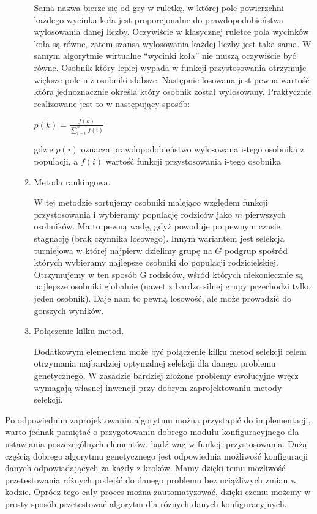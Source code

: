 \begin{par}
\begin{enumerate}
\begin{par}
\begin{enumerate}
				\begin{par}
					Sama nazwa bierze się od gry w ruletkę, w której pole powierzchni każdego wycinka koła jest proporcjonalne do prawdopodobieństwa wylosowania danej liczby. 
					Oczywiście w klasycznej ruletce pola wycinków koła są równe, zatem szansa wylosowania każdej liczby jest taka sama.
					W samym algorytmie wirtualne ``wycinki koła'' nie muszą oczywiście być równe. 
					Osobnik który lepiej wypada w funkcji przystosowania otrzymuje większe pole niż osobniki słabsze. 
					Następnie losowana jest pewna wartość która jednoznacznie określa który osobnik został wylosowany.
					Praktycznie realizowane jest to w następujący sposób:
					\begin{center}
						$p(k)=\frac{f(k)}{\displaystyle\sum\limits_{i=0}^n f(i)}$
					\end{center}
					gdzie $p(i)$ oznacza prawdopodobieństwo wylosowana i-tego osobnika z populacji, a $f(i)$ wartość funkcji przystosowania i-tego osobnika
				\end{par}
			\item Metoda rankingowa.
				\begin{par}
					W tej metodzie sortujemy osobniki malejąco względem funkcji przystosowania i wybieramy populację rodziców jako $m$ pierwszych osobników. 
					Ma to pewną wadę, gdyż powoduje po pewnym czasie stagnację (brak czynnika losowego). 
					Innym wariantem jest selekcja turniejowa w której najpierw dzielimy grupę na $G$ podgrup spośród których wybieramy najlepsze osobniki do populacji rodzicielskiej. 
					Otrzymujemy w ten sposób G rodziców, wśród których niekoniecznie są najlepsze osobniki globalnie (nawet z bardzo silnej grupy przechodzi tylko jeden osobnik). 
					Daje nam to pewną losowość, ale może prowadzić do gorszych wyników.
				\end{par}
			\item Połączenie kilku metod.
				\begin{par}
					Dodatkowym elementem może być połączenie kilku metod selekcji celem otrzymania najbardziej optymalnej selekcji dla danego problemu genetycznego. 
					W zasadzie bardziej złożone problemy ewolucyjne wręcz wymagają własnej inwencji przy dobrym zaprojektowaniu metody selekcji.
				\end{par}
		\end{enumerate}
	\end{par}
\end{enumerate}
Po odpowiednim zaprojektowaniu algorytmu można przystąpić do implementacji, warto jednak pamiętać o przygotowaniu dobrego modułu konfiguracyjnego dla ustawiania poszczególnych elementów, bądź wag w funkcji przystosowania.
Dużą częścią dobrego algorytmu genetycznego jest odpowiednia możliwość konfiguracji danych odpowiadających za każdy z kroków.
Mamy dzięki temu możliwość przetestowania różnych podejść do danego problemu bez uciążliwych zmian w kodzie. 
Oprócz tego cały proces można zautomatyzować, dzięki czemu możemy w prosty sposób przetestować algorytm dla różnych danych konfiguracyjnych.
\end{par}
